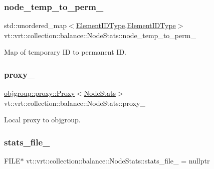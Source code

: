 \subsubsection{\texorpdfstring{node\+\_\+temp\+\_\+to\+\_\+perm\+\_\+}{node\_temp\_to\_perm\_}}
{\footnotesize\ttfamily std\+::unordered\+\_\+map$<$\hyperlink{namespacevt_1_1vrt_1_1collection_1_1balance_a14c8d2c972f2913aa3f1636e5be0a120}{Element\+I\+D\+Type},\hyperlink{namespacevt_1_1vrt_1_1collection_1_1balance_a14c8d2c972f2913aa3f1636e5be0a120}{Element\+I\+D\+Type}$>$ vt\+::vrt\+::collection\+::balance\+::\+Node\+Stats\+::node\+\_\+temp\+\_\+to\+\_\+perm\+\_\+\hspace{0.3cm}{\ttfamily [private]}}



Map of temporary ID to permanent ID. 

\mbox{\label{structvt_1_1vrt_1_1collection_1_1balance_1_1_node_stats_ab0f4d7d14401bec36a6bfca304935032}} 
\subsubsection{\texorpdfstring{proxy\+\_\+}{proxy\_}}
{\footnotesize\ttfamily \hyperlink{structvt_1_1objgroup_1_1proxy_1_1_proxy}{objgroup\+::proxy\+::\+Proxy}$<$\hyperlink{structvt_1_1vrt_1_1collection_1_1balance_1_1_node_stats}{Node\+Stats}$>$ vt\+::vrt\+::collection\+::balance\+::\+Node\+Stats\+::proxy\+\_\+\hspace{0.3cm}{\ttfamily [private]}}



Local proxy to objgroup. 

\mbox{\label{structvt_1_1vrt_1_1collection_1_1balance_1_1_node_stats_a8f2c59c675643634d8e4d2d5ba89ecbd}} 
\subsubsection{\texorpdfstring{stats\+\_\+file\+\_\+}{stats\_file\_}}
{\footnotesize\ttfamily F\+I\+LE$\ast$ vt\+::vrt\+::collection\+::balance\+::\+Node\+Stats\+::stats\+\_\+file\+\_\+ = nullptr\hspace{0.3cm}{\ttfamily [private]}}



